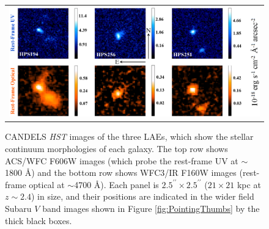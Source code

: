\documentclass{emulateapj}
\def\arcsec{^{\prime\prime}}
\begin{document}
	\begin{figure}[t]
	\begin{center}
	\begin{tabular}{c}
	\includegraphics[width=17cm]{f8.png}
	\end{tabular}
	\end{center}
	\caption[example] 
	{ \label{fig:COSMOSThumbs} 
	CANDELS \textit{HST} images \citep{koekemoer2011} of the three LAEs, which show the stellar continuum morphologies of each galaxy. The top row shows ACS/WFC F606W images (which probe the rest-frame UV at $\sim$1800 \AA) and the bottom row shows WFC3/IR F160W images (rest-frame optical at $\sim$4700 \AA). Each panel is $2.5\arcsec\times2.5\arcsec$ ($21\times21$ kpc at $z\sim2.4$) in size, and their positions are indicated in the wider field Subaru $V$ band images shown in Figure \ref{fig:PointingThumbs} by the thick black boxes.}
	\end{figure} 
\end{document}

